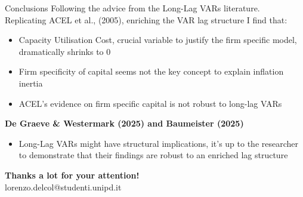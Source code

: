 \documentclass[11pt]{beamer}
\makeatletter
\newcommand{\email}{lorenzo.delcol@studenti.unipd.it}
\makeatother
\begin{document}
\begin{frame}{Conclusions}
    Following the advice from the Long-Lag VARs literature.
    \\
    Replicating ACEL et al., (2005), enriching the VAR lag structure I find that:
    \begin{itemize}
        \item Capacity Utilisation Cost, crucial variable to justify the firm specific model, dramatically shrinks to 0
        \item Firm specificity of capital seems not the key concept to explain inflation inertia
        \item ACEL's evidence on firm specific capital is not robust to long-lag VARs
    \end{itemize} 
    \vspace{0.5cm}
    \pause

    \hfill {\color{PadovaRed}\small \textbf{De Graeve \& Westermark (2025) and Baumeister (2025)} }
    \begin{itemize}
        \item Long-Lag VARs might have structural implications, it's up to the researcher to demonstrate that their findings are robust to an enriched lag structure
    \end{itemize}
    
\end{frame}




\begin{frame}
\begin{center}
    \Large \textbf{\textcolor{PadovaRed}{Thanks a lot for your attention!}} \\
    \vspace{1cm}
    \normalsize \email
\end{center}
\end{frame}

\appendix

\end{document}
